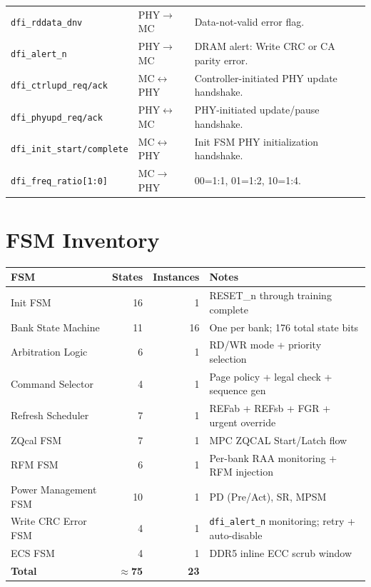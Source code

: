 \documentclass[10pt,a4paper]{article}
\newcommand{\Th}[1]{\cellcolor{cellbg}\textbf{\small #1}}
\newcommand{\RA}{\rowcolor{white}}
\newcommand{\RB}{\rowcolor{altbg}}
\begin{document}
\begin{center}
\begin{tabularx}{\linewidth}{@{} l l X @{}}
\RB \texttt{dfi\_rddata\_dnv} & PHY$\to$MC & Data-not-valid error flag. \\
\RA \texttt{dfi\_alert\_n} & PHY$\to$MC & DRAM alert: Write CRC or CA parity error. \\
\RB \texttt{dfi\_ctrlupd\_req/ack} & MC$\leftrightarrow$PHY & Controller-initiated PHY update handshake. \\
\RA \texttt{dfi\_phyupd\_req/ack} & PHY$\leftrightarrow$MC & PHY-initiated update/pause handshake. \\
\RB \texttt{dfi\_init\_start/complete} & MC$\leftrightarrow$PHY & Init FSM PHY initialization handshake. \\
\RA \texttt{dfi\_freq\_ratio[1:0]} & MC$\to$PHY & 00=1:1, 01=1:2, 10=1:4. \\
\bottomrule
\end{tabularx}
\end{center}

\section{FSM Inventory}

\begin{center}
\begin{tabularx}{0.9\linewidth}{@{} l r r X @{}}
\toprule
\Th{FSM} & \Th{States} & \Th{Instances} & \Th{Notes} \\
\midrule
\RA Init FSM & 16 & 1 & RESET\_n through training complete \\
\RB Bank State Machine & 11 & 16 & One per bank; 176 total state bits \\
\RA Arbitration Logic & 6 & 1 & RD/WR mode + priority selection \\
\RB Command Selector & 4 & 1 & Page policy + legal check + sequence gen \\
\RA Refresh Scheduler & 7 & 1 & REFab + REFsb + FGR + urgent override \\
\RB ZQcal FSM & 7 & 1 & MPC ZQCAL Start/Latch flow \\
\RA RFM FSM & 6 & 1 & Per-bank RAA monitoring + RFM injection \\
\RB Power Management FSM & 10 & 1 & PD (Pre/Act), SR, MPSM \\
\RA Write CRC Error FSM & 4 & 1 & \texttt{dfi\_alert\_n} monitoring; retry + auto-disable \\
\RB ECS FSM & 4 & 1 & DDR5 inline ECC scrub window \\
\midrule
\RA \textbf{Total} & \textbf{$\approx$75} & \textbf{23} & \\
\bottomrule
\end{tabularx}
\end{center}
\end{document}
